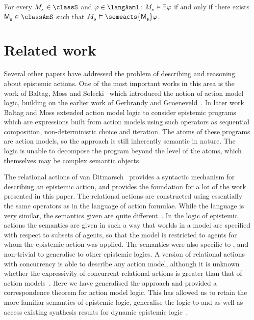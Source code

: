 \begin{corollary}
For every $\kPModel{\kStateS} \in \classS$ and $\phi \in \langAaml$: $\kPModel{\kStateS} \entails \somerefs \phi$ if and only if there exists $\aPModel{\aStateS} \in \classAmS$ such that $\kPModel{\kStateS} \entails \someacts{\aPModel{\aStateS}} \phi$.
\end{corollary}

\section{Related work}\label{related-work}

Several other papers have addressed the problem of describing and reasoning about epistemic actions.
One of the most important works in this area is the work of Baltag, Moss and Solecki~\cite{baltag:1998} which introduced the notion of action model logic, building on the earlier work of Gerbrandy and Groeneveld~\cite{gerbrandy:1997}.
In later work Baltag and Moss extended action model logic to consider epistemic programs~\cite{baltag:2004} which are expressions built from action models using such operators as sequential composition, non-deterministic choice and iteration.
The atoms of these programs are action models, so the approach is still inherently semantic in nature.
The logic is unable to decompose the program beyond the level of the atoms, which themselves may be complex semantic objects.

The relational actions of van Ditmarsch~\cite{vanditmarsch:2000} provides a syntactic mechanism for describing an epistemic action, and provides the foundation for a lot of the work presented in this paper.
The relational actions are constructed using essentially the same operators as in the language of action formulae.
While the language is very similar, the semantics given are quite different~\cite{vanditmarsch:2007}.
In the logic of epistemic actions the semantics are given in such a way that worlds in a model are specified with respect to subsets of agents, so that the model is restricted to agents for whom the epistemic action was applied.
The semantics were also specific to \classS{}, and non-trivial to generalise to other epistemic logics.
A version of relational actions with concurrency is able to describe any \classS{} action model, although it is unknown whether the expressivity of concurrent relational actions is greater than that of action models~\cite{baltag:2006}.
Here we have generalised the approach and provided a correspondence theorem for action model logic.
This has allowed us to retain the more familiar semantics of epistemic logic, generalise the logic to \classK{} and \classKFF{} as well as access existing synthesis results for dynamic epistemic logic~\cite{hales:2013}.

